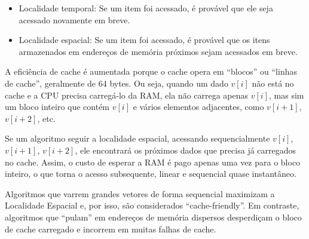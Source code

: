 \begin{itemize}
    \item Localidade temporal: Se um item foi acessado, é provável que ele seja acessado novamente em breve.
    \item Localidade espacial: Se um item foi acessado, é provável que os itens armazenados em endereços de memória próximos sejam acessados em breve.
\end{itemize}

A eficiência de cache é aumentada porque o cache opera em ``blocos'' ou ``linhas de cache'', geralmente de 64 bytes. Ou seja, quando um dado $v[i]$ não está no cache e a CPU precisa carregá-lo da RAM, ela não carrega apenas $v[i]$, mas sim um bloco inteiro que contém $v[i]$ e vários elementos adjacentes, como $v[i+1]$, $v[i+2]$, etc.

Se um algoritmo seguir a localidade espacial, acessando sequencialmente $v[i]$, $v[i+1]$, $v[i+2]$, ele encontrará os próximos dados que precisa já carregados no cache. Assim, o custo de esperar a RAM é pago apenas uma vez para o bloco inteiro, o que torna o acesso subsequente, linear e sequencial quase instantâneo.

Algoritmos que varrem grandes vetores de forma sequencial maximizam a Localidade Espacial e, por isso, são considerados ``cache-friendly''. Em contraste, algoritmos que ``pulam'' em endereços de memória dispersos desperdiçam o bloco de cache carregado e incorrem em muitas falhas de cache.

